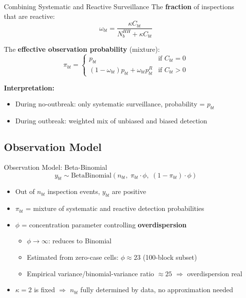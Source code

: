\documentclass[aspectratio=169]{beamer}
\begin{document}
\begin{frame}{Combining Systematic and Reactive Surveillance}
  The \textbf{fraction} of inspections that are reactive:
  \begin{equation*}
    \omega_{bt} = \frac{\kappa C_{bt}}{N_b^{HH} + \kappa C_{bt}}
  \end{equation*}
  
  \vspace{1cm}
  
  The \textbf{effective observation probability} (mixture):
  \begin{equation*}
    \pi_{bt} = \begin{cases}
      p_{bt} & \text{if } C_{bt} = 0 \\
      (1 - \omega_{bt})p_{bt} + \omega_{bt}p_{bt}^R & \text{if } C_{bt} > 0
    \end{cases}
  \end{equation*}
  
  \vspace{1cm}
  
  \textbf{Interpretation:}
  \begin{itemize}
    \item During no-outbreak: only systematic surveillance, probability = $p_{bt}$
    \item During outbreak: weighted mix of unbiased and biased detection
  \end{itemize}
\end{frame}

\subsection{Observation Model}

\begin{frame}{Observation Model: Beta-Binomial}
  \begin{equation*}
    y_{bt} \sim \text{BetaBinomial}(n_{bt},\; \pi_{bt}\cdot\phi,\; (1-\pi_{bt})\cdot\phi)
  \end{equation*}

  \begin{itemize}
    \item Out of $n_{bt}$ inspection events, $y_{bt}$ are positive
    \item $\pi_{bt}$ = mixture of systematic and reactive detection probabilities
    \item $\phi$ = concentration parameter controlling \textbf{overdispersion}
      \begin{itemize}
        \item $\phi \to \infty$: reduces to Binomial
        \item Estimated from zero-case cells: $\phi \approx 23$ (100-block subset)
        \item Empirical variance/binomial-variance ratio $\approx 25$ $\Rightarrow$ overdispersion real
      \end{itemize}
    \item $\kappa = 2$ is fixed $\Rightarrow$ $n_{bt}$ fully determined by data, no approximation needed
  \end{itemize}
\end{frame}
\end{document}

